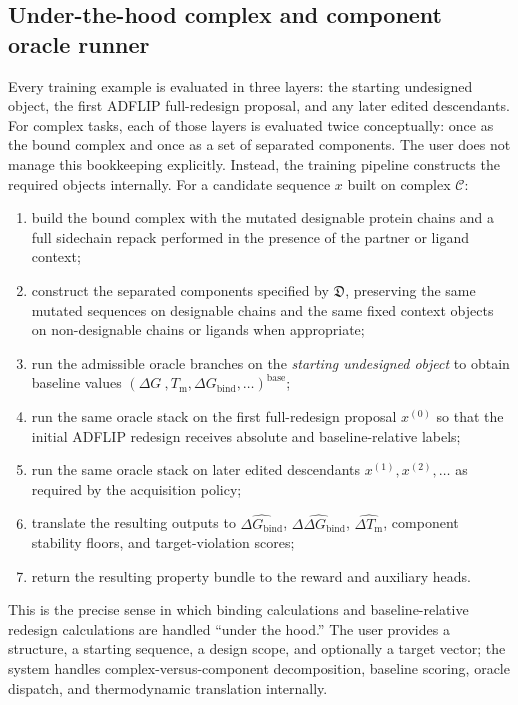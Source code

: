 \documentclass[11pt]{article}
\newcommand{\dG}{\ensuremath{\Delta G \ }}
\newcommand{\Tm}{\ensuremath{T_{\mathrm m}}}
\newcommand{\DGbind}{\ensuremath{\Delta G_{\mathrm{bind}}}}
\newcommand{\ddGbind}{\ensuremath{\Delta\Delta G_{\mathrm{bind}}}}
\newcommand{\dGbind}{\ensuremath{\Delta G_{\mathrm{bind}}}}
\newcommand{\Cx}{\mathcal{C}}
\begin{document}
	
	
	\subsection{Under-the-hood complex and component oracle runner}
	
	Every training example is evaluated in three layers: the starting undesigned object, the first ADFLIP full-redesign proposal, and any later edited descendants. For complex tasks, each of those layers is evaluated twice conceptually: once as the bound complex and once as a set of separated components. The user does not manage this bookkeeping explicitly. Instead, the training pipeline constructs the required objects internally. For a candidate sequence $x$ built on complex $\Cx$:
	\begin{enumerate}[leftmargin=1.5em]
		\item build the bound complex with the mutated designable protein chains and a full sidechain repack performed in the presence of the partner or ligand context;
		\item construct the separated components specified by $\mathfrak{D}$, preserving the same mutated sequences on designable chains and the same fixed context objects on non-designable chains or ligands when appropriate;
		\item run the admissible oracle branches on the \emph{starting undesigned object} to obtain baseline values $(\dG,\Tm,\DGbind,\ldots)^{\mathrm{base}}$;
		\item run the same oracle stack on the first full-redesign proposal $x^{(0)}$ so that the initial ADFLIP redesign receives absolute and baseline-relative labels;
		\item run the same oracle stack on later edited descendants $x^{(1)},x^{(2)},\ldots$ as required by the acquisition policy;
		\item translate the resulting outputs to $\widehat{\dGbind}$, $\widehat{\ddGbind}$, $\widehat{\Delta \Tm}$, component stability floors, and target-violation scores;
		\item return the resulting property bundle to the reward and auxiliary heads.
	\end{enumerate}
	This is the precise sense in which binding calculations and baseline-relative redesign calculations are handled ``under the hood.'' The user provides a structure, a starting sequence, a design scope, and optionally a target vector; the system handles complex-versus-component decomposition, baseline scoring, oracle dispatch, and thermodynamic translation internally.
	
\end{document}
